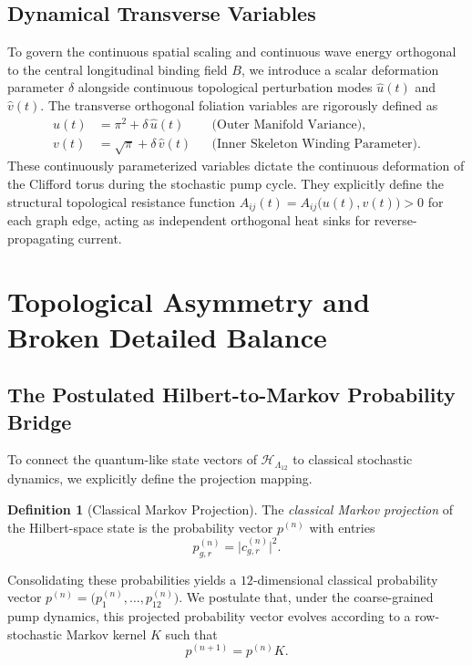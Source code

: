 \documentclass[11pt]{article}
\theoremstyle{plain}
\theoremstyle{definition}
\newtheorem*{xdefinition}{Definition}
\newcommand{\Hilb}{\mathcal{H}}
\begin{document}
\subsection{Dynamical Transverse Variables}
To govern the continuous spatial scaling and continuous wave energy orthogonal
to the central longitudinal binding field $B$, we introduce a scalar
deformation parameter $\delta$ alongside continuous topological perturbation
modes $\hat{u}(t)$ and $\hat{v}(t)$. The transverse orthogonal foliation
variables are rigorously defined as
\begin{align*}
  u(t) &= \pi^{2} + \delta\,\hat{u}(t)
        && \text{(Outer Manifold Variance)},\\[2pt]
  v(t) &= \sqrt{\pi} + \delta\,\hat{v}(t)
        && \text{(Inner Skeleton Winding Parameter)}.
\end{align*}
These continuously parameterized variables dictate the continuous deformation of
the Clifford torus during the stochastic pump cycle. They explicitly define the
structural topological resistance function
$A_{ij}(t) = A_{ij}\bigl(u(t),v(t)\bigr) > 0$ for each graph edge, acting as
independent orthogonal heat sinks for reverse-propagating current.

\section{Topological Asymmetry and Broken Detailed Balance}

\subsection{The Postulated Hilbert-to-Markov Probability Bridge}
To connect the quantum-like state vectors of $\Hilb_{\Lambda_{12}}$ to classical
stochastic dynamics, we explicitly define the projection mapping.

\begin{xdefinition}[Classical Markov Projection]
The \emph{classical Markov projection} of the Hilbert-space state is the
probability vector $p^{(n)}$ with entries
\[
  p_{g,r}^{(n)} = \bigl\lvert c_{g,r}^{(n)} \bigr\rvert^{2}.
\]
\end{xdefinition}

\noindent
Consolidating these probabilities yields a $12$-dimensional classical
probability vector $p^{(n)} = \bigl(p_1^{(n)},\dots,p_{12}^{(n)}\bigr)$. We
postulate that, under the coarse-grained pump dynamics, this projected
probability vector evolves according to a row-stochastic Markov kernel $K$ such
that
\[
  p^{(n+1)} = p^{(n)} K.
\]
\end{document}
